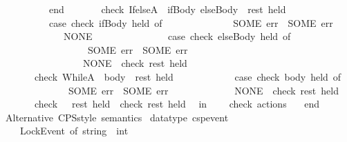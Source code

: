 \begin{isabellebody}
\ \ \ \ \ \ \ \ \ \ end\isanewline
\ \ \ \ \ \ {\isacharbar}{\kern0pt}\ check\ {\isacharparenleft}{\kern0pt}IfelseA\ {\isacharparenleft}{\kern0pt}{\isacharparenleft}{\kern0pt}{\isacharunderscore}{\kern0pt}{\isacharcomma}{\kern0pt}\ ifBody{\isacharparenright}{\kern0pt}{\isacharcomma}{\kern0pt}\ elseBody{\isacharparenright}{\kern0pt}\ {\isacharcolon}{\kern0pt}{\isacharcolon}{\kern0pt}\ rest{\isacharparenright}{\kern0pt}\ held\ {\isacharequal}{\kern0pt}\isanewline
\ \ \ \ \ \ \ \ \ \ {\isacharparenleft}{\kern0pt}case\ check\ ifBody\ held\ of\isanewline
\ \ \ \ \ \ \ \ \ \ \ \ \ \ SOME\ err\ {\isacharequal}{\kern0pt}{\isachargreater}{\kern0pt}\ SOME\ err\isanewline
\ \ \ \ \ \ \ \ \ \ \ \ {\isacharbar}{\kern0pt}\ NONE\ {\isacharequal}{\kern0pt}{\isachargreater}{\kern0pt}\isanewline
\ \ \ \ \ \ \ \ \ \ \ \ \ \ {\isacharparenleft}{\kern0pt}case\ check\ elseBody\ held\ of\isanewline
\ \ \ \ \ \ \ \ \ \ \ \ \ \ \ \ \ \ SOME\ err\ {\isacharequal}{\kern0pt}{\isachargreater}{\kern0pt}\ SOME\ err\isanewline
\ \ \ \ \ \ \ \ \ \ \ \ \ \ \ \ {\isacharbar}{\kern0pt}\ NONE\ {\isacharequal}{\kern0pt}{\isachargreater}{\kern0pt}\ check\ rest\ held{\isacharparenright}{\kern0pt}{\isacharparenright}{\kern0pt}\isanewline
\ \ \ \ \ \ {\isacharbar}{\kern0pt}\ check\ {\isacharparenleft}{\kern0pt}WhileA\ {\isacharparenleft}{\kern0pt}{\isacharunderscore}{\kern0pt}{\isacharcomma}{\kern0pt}\ body{\isacharparenright}{\kern0pt}\ {\isacharcolon}{\kern0pt}{\isacharcolon}{\kern0pt}\ rest{\isacharparenright}{\kern0pt}\ held\ {\isacharequal}{\kern0pt}\ \isanewline
\ \ \ \ \ \ \ \ \ \ {\isacharparenleft}{\kern0pt}case\ check\ body\ held\ of\isanewline
\ \ \ \ \ \ \ \ \ \ \ \ \ \ SOME\ err\ {\isacharequal}{\kern0pt}{\isachargreater}{\kern0pt}\ SOME\ err\isanewline
\ \ \ \ \ \ \ \ \ \ \ \ {\isacharbar}{\kern0pt}\ NONE\ {\isacharequal}{\kern0pt}{\isachargreater}{\kern0pt}\ check\ rest\ held{\isacharparenright}{\kern0pt}\isanewline
\ \ \ \ \ \ {\isacharbar}{\kern0pt}\ check\ {\isacharparenleft}{\kern0pt}{\isacharunderscore}{\kern0pt}\ {\isacharcolon}{\kern0pt}{\isacharcolon}{\kern0pt}\ rest{\isacharparenright}{\kern0pt}\ held\ {\isacharequal}{\kern0pt}\ check\ rest\ held\isanewline
\ \ in\isanewline
\ \ \ \ check\ actions\ {\isacharbrackleft}{\kern0pt}{\isacharbrackright}{\kern0pt}\isanewline
\ \ end\isanewline
\isanewline
{\isacharparenleft}{\kern0pt}{\isacharasterisk}{\kern0pt}\ Alternative\ CPS{\isacharminus}{\kern0pt}style\ semantics\ {\isacharasterisk}{\kern0pt}{\isacharparenright}{\kern0pt}\isanewline
datatype\ csp{\isacharunderscore}{\kern0pt}event\ {\isacharequal}{\kern0pt}\ \isanewline
\ \ \ \ LockEvent\ of\ string\ {\isacharasterisk}{\kern0pt}\ int\isanewline

\end{isabellebody}

